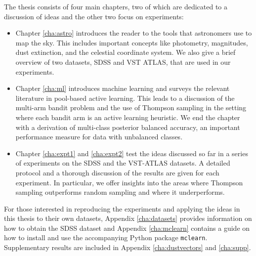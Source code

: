 The thesis consists of four main chapters, two of which are dedicated to a discussion of ideas and
the other two focus on experiments:
	\begin{itemize}
		\item Chapter \ref{cha:astro} introduces the reader to the tools that astronomers use
		to map the sky. This includes important concepts like photometry, magnitudes, dust
		extinction, and the celestial coordinate system. We also give a brief overview of
		two datasets, SDSS and VST ATLAS, that are used in our experiments.
		
		\item Chapter \ref{cha:ml} introduces machine learning and surveys the relevant literature
		in pool-based active learning. This leads to a discussion of the multi-arm bandit problem
		and the use of Thompson sampling in the setting where each bandit arm is an active learning
		heuristic. We end the chapter with a derivation of multi-class posterior balanced accuracy,
		an important performance measure for data with unbalanced classes.
		
		\item Chapter \ref{cha:expt1} and \ref{cha:expt2} test the ideas discussed so far in a
		series of experiments on the SDSS and the VST-ATLAS datasets. A detailed protocol and a
		thorough discussion of the results are given for each experiment. In particular, we offer
		insights into the areas where Thompson sampling outperforms random sampling and where it
		underperforms. 
	\end{itemize}
For those interested in reproducing the experiments and applying the ideas in this thesis to their
own datasets, Appendix \ref{cha:datasets} provides information on how to obtain the SDSS dataset and
Appendix \ref{cha:mclearn} contains a guide on how to install and use the
accompanying Python package \texttt{mclearn}. Supplementary results are included in Appendix
\ref{cha:dustvectors} and \ref{cha:supp}.

